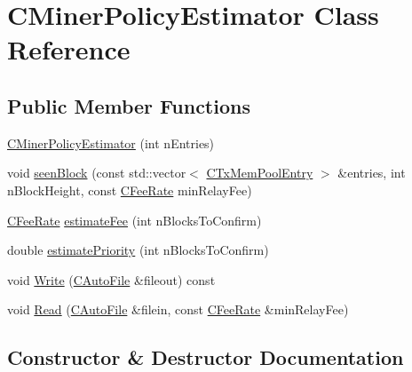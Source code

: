 \hypertarget{class_c_miner_policy_estimator}{}\section{C\+Miner\+Policy\+Estimator Class Reference}
\label{class_c_miner_policy_estimator}
\subsection*{Public Member Functions}
\begin{DoxyCompactItemize}
\item 
\hyperlink{class_c_miner_policy_estimator_a13e8fe709d07a3e6b1bf31fbc128a998}{C\+Miner\+Policy\+Estimator} (int n\+Entries)
\item 
void \hyperlink{class_c_miner_policy_estimator_a2b30e1eaa7eec2744c576fba5bd1a168}{seen\+Block} (const std\+::vector$<$ \hyperlink{class_c_tx_mem_pool_entry}{C\+Tx\+Mem\+Pool\+Entry} $>$ \&entries, int n\+Block\+Height, const \hyperlink{class_c_fee_rate}{C\+Fee\+Rate} min\+Relay\+Fee)
\item 
\hyperlink{class_c_fee_rate}{C\+Fee\+Rate} \hyperlink{class_c_miner_policy_estimator_a00b6f58a508ee87999910972f37b3281}{estimate\+Fee} (int n\+Blocks\+To\+Confirm)
\item 
double \hyperlink{class_c_miner_policy_estimator_ae9bb4813622680e6e3b48ea8c0ce41b6}{estimate\+Priority} (int n\+Blocks\+To\+Confirm)
\item 
void \hyperlink{class_c_miner_policy_estimator_aeb98d716f91294503bd5738589ffe6c3}{Write} (\hyperlink{class_c_auto_file}{C\+Auto\+File} \&fileout) const 
\item 
void \hyperlink{class_c_miner_policy_estimator_a86e709bc44e9f6f597519173f15595ff}{Read} (\hyperlink{class_c_auto_file}{C\+Auto\+File} \&filein, const \hyperlink{class_c_fee_rate}{C\+Fee\+Rate} \&min\+Relay\+Fee)
\end{DoxyCompactItemize}


\subsection{Constructor \& Destructor Documentation}
\hypertarget{class_c_miner_policy_estimator_a13e8fe709d07a3e6b1bf31fbc128a998}{}
